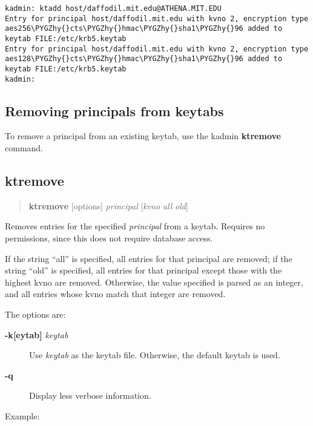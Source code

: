 \documentclass[letterpaper,10pt,english]{sphinxmanual}
\def\PYGZhy{\char`\-}
\begin{document}
\begin{Verbatim}[commandchars=\\\{\}]
kadmin: ktadd host/daffodil.mit.edu@ATHENA.MIT.EDU
Entry for principal host/daffodil.mit.edu with kvno 2, encryption type aes256\PYGZhy{}cts\PYGZhy{}hmac\PYGZhy{}sha1\PYGZhy{}96 added to keytab FILE:/etc/krb5.keytab
Entry for principal host/daffodil.mit.edu with kvno 2, encryption type aes128\PYGZhy{}cts\PYGZhy{}hmac\PYGZhy{}sha1\PYGZhy{}96 added to keytab FILE:/etc/krb5.keytab
kadmin:
\end{Verbatim}


\subsection{Removing principals from keytabs}
\label{admin/appl_servers:removing-principals-from-keytabs}
To remove a principal from an existing keytab, use the kadmin
\textbf{ktremove} command.


\subsection{ktremove}
\label{admin/appl_servers:ktremove}\begin{quote}

\textbf{ktremove} {[}options{]} \emph{principal} {[}\emph{kvno} \textbar{} \emph{all} \textbar{} \emph{old}{]}
\end{quote}

Removes entries for the specified \emph{principal} from a keytab.  Requires
no permissions, since this does not require database access.

If the string ``all'' is specified, all entries for that principal are
removed; if the string ``old'' is specified, all entries for that
principal except those with the highest kvno are removed.  Otherwise,
the value specified is parsed as an integer, and all entries whose
kvno match that integer are removed.

The options are:
\begin{description}
\item[{\textbf{-k{[}eytab{]}} \emph{keytab}}] \leavevmode
Use \emph{keytab} as the keytab file.  Otherwise, the default keytab is
used.

\item[{\textbf{-q}}] \leavevmode
Display less verbose information.

\end{description}

Example:
\end{document}
